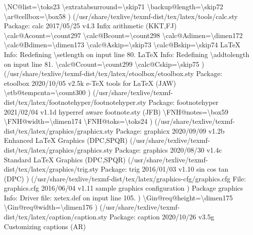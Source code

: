 \documentclass[
  letterpaper,
  DIV=11,
  numbers=noendperiod]{scrartcl}
\newenvironment{Shaded}{\begin{snugshade}}{\end{snugshade}}
\newcommand{\NormalTok}[1]{\textcolor[rgb]{0.00,0.23,0.31}{#1}}
\begin{document}
\begin{Shaded}
\begin{Highlighting}[]
\NormalTok{\textbackslash{}NC@list=\textbackslash{}toks23}
\NormalTok{\textbackslash{}extratabsurround=\textbackslash{}skip71}
\NormalTok{\textbackslash{}backup@length=\textbackslash{}skip72}
\NormalTok{\textbackslash{}ar@cellbox=\textbackslash{}box58}
\NormalTok{) (/usr/share/texlive/texmf{-}dist/tex/latex/tools/calc.sty}
\NormalTok{Package: calc 2017/05/25 v4.3 Infix arithmetic (KKT,FJ)}
\NormalTok{\textbackslash{}calc@Acount=\textbackslash{}count297}
\NormalTok{\textbackslash{}calc@Bcount=\textbackslash{}count298}
\NormalTok{\textbackslash{}calc@Adimen=\textbackslash{}dimen172}
\NormalTok{\textbackslash{}calc@Bdimen=\textbackslash{}dimen173}
\NormalTok{\textbackslash{}calc@Askip=\textbackslash{}skip73}
\NormalTok{\textbackslash{}calc@Bskip=\textbackslash{}skip74}
\NormalTok{LaTeX Info: Redefining \textbackslash{}setlength on input line 80.}
\NormalTok{LaTeX Info: Redefining \textbackslash{}addtolength on input line 81.}
\NormalTok{\textbackslash{}calc@Ccount=\textbackslash{}count299}
\NormalTok{\textbackslash{}calc@Cskip=\textbackslash{}skip75}
\NormalTok{) (/usr/share/texlive/texmf{-}dist/tex/latex/etoolbox/etoolbox.sty}
\NormalTok{Package: etoolbox 2020/10/05 v2.5k e{-}TeX tools for LaTeX (JAW)}
\NormalTok{\textbackslash{}etb@tempcnta=\textbackslash{}count300}
\NormalTok{) (/usr/share/texlive/texmf{-}dist/tex/latex/footnotehyper/footnotehyper.sty}
\NormalTok{Package: footnotehyper 2021/02/04 v1.1d hyperref aware footnote.sty (JFB)}
\NormalTok{\textbackslash{}FNH@notes=\textbackslash{}box59}
\NormalTok{\textbackslash{}FNH@width=\textbackslash{}dimen174}
\NormalTok{\textbackslash{}FNH@toks=\textbackslash{}toks24}
\NormalTok{) (/usr/share/texlive/texmf{-}dist/tex/latex/graphics/graphicx.sty}
\NormalTok{Package: graphicx 2020/09/09 v1.2b Enhanced LaTeX Graphics (DPC,SPQR)}
\NormalTok{(/usr/share/texlive/texmf{-}dist/tex/latex/graphics/graphics.sty}
\NormalTok{Package: graphics 2020/08/30 v1.4c Standard LaTeX Graphics (DPC,SPQR)}
\NormalTok{(/usr/share/texlive/texmf{-}dist/tex/latex/graphics/trig.sty}
\NormalTok{Package: trig 2016/01/03 v1.10 sin cos tan (DPC)}
\NormalTok{) (/usr/share/texlive/texmf{-}dist/tex/latex/graphics{-}cfg/graphics.cfg}
\NormalTok{File: graphics.cfg 2016/06/04 v1.11 sample graphics configuration}
\NormalTok{)}
\NormalTok{Package graphics Info: Driver file: xetex.def on input line 105.}
\NormalTok{)}
\NormalTok{\textbackslash{}Gin@req@height=\textbackslash{}dimen175}
\NormalTok{\textbackslash{}Gin@req@width=\textbackslash{}dimen176}
\NormalTok{) (/usr/share/texlive/texmf{-}dist/tex/latex/caption/caption.sty}
\NormalTok{Package: caption 2020/10/26 v3.5g Customizing captions (AR)}

\end{Highlighting}
\end{Shaded}
\end{document}

